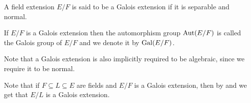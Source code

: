 \documentclass[11pt,a4paper]{article}
\begin{document}
\begin{definition}
  A field extension $E/F$ is said to be a Galois extension
  if it is separable and normal.
\end{definition}
\begin{remark}
  If $E/F$ is a Galois extension
  then the automorphism group $\operatorname{Aut}(E/F)$ is called the Galois group
  of $E/F$ and we denote it by $\operatorname{Gal}(E/F)$.
\end{remark}
\begin{remark}
  Note that a Galois extension is also implicitly required
  to be algebraic, since we require it to be normal.
\end{remark}
\begin{remark}
  Note that if $F \subseteq L \subseteq E$ are fields
  and $E/F$ is a Galois extension,
  then by 
  and 
  we get that $E/L$ is a Galois extension.
\end{remark}
\end{document}
